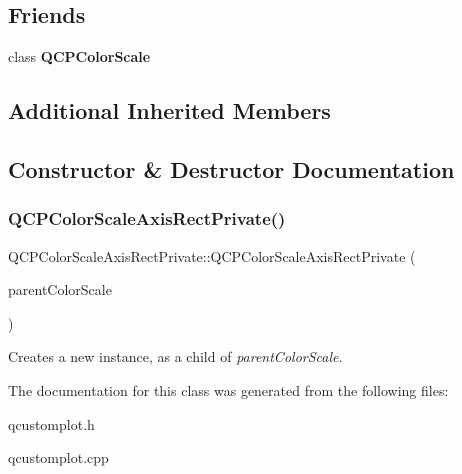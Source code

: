 \subsection*{Friends}
\begin{DoxyCompactItemize}
\item 
\mbox{\label{class_q_c_p_color_scale_axis_rect_private_a60f6031408a325ebd1bbbad1ccf9b897}} 
class {\bfseries Q\+C\+P\+Color\+Scale}
\end{DoxyCompactItemize}
\subsection*{Additional Inherited Members}


\subsection{Constructor \& Destructor Documentation}
\mbox{\label{class_q_c_p_color_scale_axis_rect_private_ad3b242f75dd2b33581364a4e668a80db}} 
\subsubsection{\texorpdfstring{Q\+C\+P\+Color\+Scale\+Axis\+Rect\+Private()}{QCPColorScaleAxisRectPrivate()}}
{\footnotesize\ttfamily Q\+C\+P\+Color\+Scale\+Axis\+Rect\+Private\+::\+Q\+C\+P\+Color\+Scale\+Axis\+Rect\+Private (\begin{DoxyParamCaption}\item[{\hyperlink{class_q_c_p_color_scale}{Q\+C\+P\+Color\+Scale} $\ast$}]{parent\+Color\+Scale }\end{DoxyParamCaption})\hspace{0.3cm}{\ttfamily [explicit]}}

Creates a new instance, as a child of {\itshape parent\+Color\+Scale}. 

The documentation for this class was generated from the following files\+:\begin{DoxyCompactItemize}
\item 
qcustomplot.\+h\item 
qcustomplot.\+cpp\end{DoxyCompactItemize}
